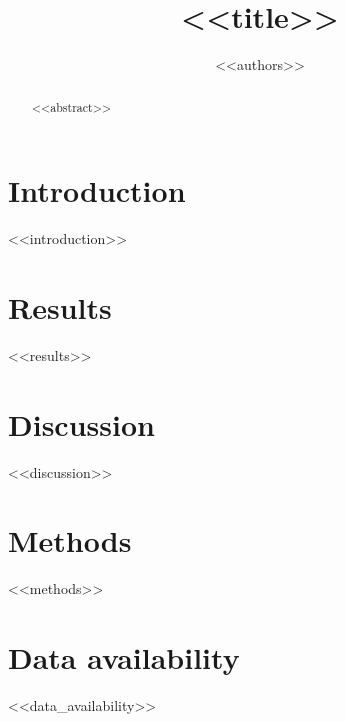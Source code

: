 \documentclass[11pt,a4paper]{article}
\title{<<title>>}
\author{<<authors>>}
\date{}
\begin{document}
\maketitle

\begin{abstract}
<<abstract>>
\end{abstract}

\section{Introduction}
<<introduction>>

\section{Results}
<<results>>

\section{Discussion}
<<discussion>>

\section{Methods}
<<methods>>

\section{Data availability}
<<data_availability>>



\end{document}

